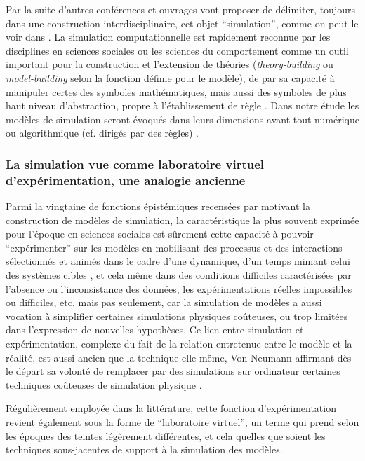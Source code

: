Par la suite d'autres conférences et ouvrages vont proposer de délimiter, toujours dans une construction interdisciplinaire, cet objet \enquote{simulation}, comme on peut le voir dans \autocites{Guetzkow1962, Borko1962, Guetzkow1972, Dutton1971}. La simulation computationnelle est rapidement reconnue par les disciplines en sciences sociales ou les sciences du comportement comme un outil important pour la construction et l'extension de théories (\textit{theory-building} ou \textit{model-building} selon la fonction définie pour le modèle), de par sa capacité à manipuler certes des symboles mathématiques, mais aussi des symboles de plus haut niveau d'abstraction, propre à l'établissement de règle \autocite[924-925]{Clarkson1960}. Dans notre étude les modèles de simulation seront évoqués dans leurs dimensions avant tout numérique ou algorithmique (cf. dirigés par des règles) \autocite[36-38]{Varenne2013}.

\subsubsection{La simulation vue comme laboratoire virtuel d'expérimentation, une analogie ancienne}
\label{ssec:labo_virtuelle}

Parmi la vingtaine de fonctions épistémiques recensées par \textcite[14-23]{Varenne2013} motivant la construction de modèles de simulation, la caractéristique la plus souvent exprimée pour l'époque en sciences sociales est sûrement cette capacité à pouvoir \enquote{expérimenter} sur les modèles en mobilisant des processus et des interactions sélectionnés et animés dans le cadre d'une dynamique, d'un temps mimant celui des systèmes cibles , et cela même dans des conditions difficiles caractérisées par l'absence ou l'inconsistance des données, les expérimentations réelles impossibles ou difficiles, etc. mais pas seulement, car la simulation de modèles a aussi vocation à simplifier certaines simulations physiques coûteuses, ou trop limitées dans l'expression de nouvelles hypothèses. Ce lien entre simulation et expérimentation, complexe du fait de la relation entretenue entre le modèle et la réalité, est aussi ancien que la technique elle-même, Von Neumann affirmant dès le départ sa volonté de remplacer par des simulations sur ordinateur certaines techniques coûteuses de simulation physique \autocite[15]{Winsberg2013}.

Régulièrement employée dans la littérature, cette fonction d’expérimentation  revient également sous la forme de \enquote{laboratoire virtuel}, un terme qui prend selon les époques des teintes légèrement différentes, et cela quelles que soient les techniques sous-jacentes de support à la simulation des modèles.

